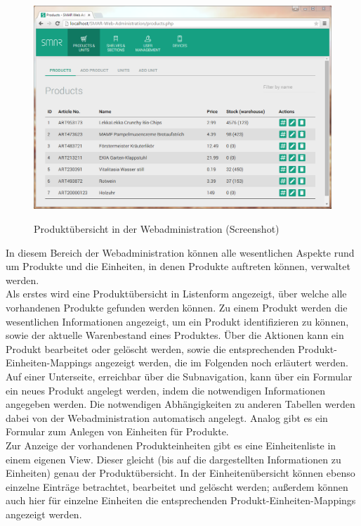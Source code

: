 \begin{figure}[H]
	\centering
	{\includegraphics[width=\textwidth]{Bilder/Abbildungen/webadmin_products.png}}
	\caption{Produktübersicht in der Webadministration (Screenshot)}
	\label{fig:webadmin_products}
\end{figure}

In diesem Bereich der Webadministration können alle wesentlichen Aspekte rund um Produkte und die Einheiten, in denen Produkte auftreten können, verwaltet werden.\\

Als erstes wird eine Produktübersicht in Listenform angezeigt, über welche alle vorhandenen Produkte gefunden werden können. Zu einem Produkt werden die wesentlichen Informationen angezeigt, um ein Produkt identifizieren zu können, sowie der aktuelle Warenbestand eines Produktes. Über die Aktionen kann ein Produkt bearbeitet oder gelöscht werden, sowie die entsprechenden Produkt-Einheiten-Mappings angezeigt werden, die im Folgenden noch erläutert werden.\\

Auf einer Unterseite, erreichbar über die Subnavigation, kann über ein Formular ein neues Produkt angelegt werden, indem die notwendigen Informationen angegeben werden. Die notwendigen Abhängigkeiten zu anderen Tabellen werden dabei von der Webadministration automatisch angelegt. Analog gibt es ein Formular zum Anlegen von Einheiten für Produkte.\\

Zur Anzeige der vorhandenen Produkteinheiten gibt es eine Einheitenliste in einem eigenen View. Dieser gleicht (bis auf die dargestellten Informationen zu Einheiten) genau der Produktübersicht. In der Einheitenübersicht können ebenso einzelne Einträge betrachtet, bearbeitet und gelöscht werden; außerdem können auch hier für einzelne Einheiten die entsprechenden Produkt-Einheiten-Mappings angezeigt werden.\\

